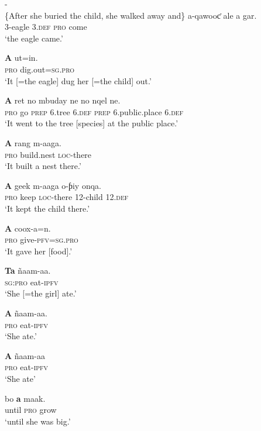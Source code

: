 \documentclass[output=paper,newtxmath,modfonts,nonflat,hidelinks]{langsci/langscibook}
\begin{document}
\ea\label{ex:apel:16}
{- \citep[283]{Faye1979}}\\
{\{After she buried the child, she walked away and\}}
\ea\label{ex:apel:16a}
\gll a-qawooƈ ale a gar.\\
     \textsc{3-}eagle \textsc{3.def} \textsc{pro} come \\
\glt ‘the eagle came.’

\ex\label{ex:apel:16b}
\gll \textbf{A}  ut=in.\\
     \textsc{pro} dig.out\textsc{=sg.pro} \\
\glt ‘It [=the eagle] dug her [=the child] out.’

\ex\label{ex:apel:16c}
\gll \textbf{A} ret no mbuday ne no nqel ne.         \\
     \textsc{pro} go \textsc{prep} \textsc{6.}tree \textsc{6.def} \textsc{prep} 6.public.place \textsc{6.def} \\
\glt ‘It went to the tree [species] at the public place.’   

\ex\label{ex:apel:16d}
\gll \textbf{A} rang m-aaga.  \\
     \textsc{pro} build.nest \textsc{loc-}there \\
\glt ‘It built a nest there.’

\ex\label{ex:apel:16e}
\gll \textbf{A} geek m-aaga o-ƥiy onqa.  \\
     \textsc{pro} keep \textsc{loc-}there \textsc{12-}child \textsc{12.def}\\
\glt ‘It kept the child there.’


\ex\label{ex:apel:16f}
\gll \textbf{A} coox-a=n.\\
     \textsc{pro} give\textsc{-pfv=sg.pro}\\
\glt ‘It gave her [food].’


\ex\label{ex:apel:16g}
\gll \textbf{Ta} ñaam-aa.\\
     \textsc{sg:pro} eat\textsc{-ipfv} \\
\glt ‘She [=the girl] ate.’


\ex\label{ex:apel:16h}
\gll \textbf{A} ñaam-aa. \\
     \textsc{pro} eat\textsc{-ipfv}\\
\glt ‘She ate.’


\ex\label{ex:apel:16i}
\gll \textbf{A} ñaam-aa\\
     \textsc{pro} eat\textsc{-ipfv}\\
\glt ‘She ate’


\ex\label{ex:apel:16j}
\gll bo \textbf{a} maak.\\
     until \textsc{pro} grow\\
\glt ‘until she was big.’
\end{document}
